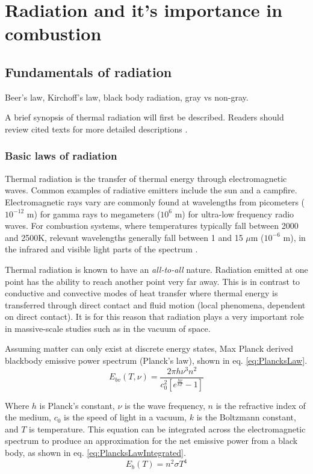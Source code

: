 \addchapheadtotoc
\chapter{Radiation and it's importance in combustion}\label{chapter:Importance}

\section{Fundamentals of radiation} \label{Sec:FundOfRad}
Beer's law, Kirchoff's law, black body radiation, gray vs non-gray.


A brief synopsis of thermal radiation will first be described. Readers should review cited texts for more detailed descriptions \cite{Howell2010ThermalTransfer,Modest2013RadiativeTransfer}.

\subsection{Basic laws of radiation}
Thermal radiation is the transfer of thermal energy through electromagnetic waves. Common examples of radiative emitters include the sun and a campfire. Electromagnetic rays vary are commonly found at wavelengths from picometers ($10^{-12}$ m) for gamma rays to megameters ($10^6$ m) for ultra-low frequency radio waves. For combustion systems, where temperatures typically fall between 2000 and 2500K, relevant wavelengths generally fall between 1 and 15 $\mu{}$m ($10^{-6}$ m), in the infrared and visible light parts of the spectrum \cite{Liu2020TheFlames}.

Thermal radiation is known to have an \textit{all-to-all} nature. Radiation emitted at one point has the ability to reach another point very far away. 
This is in contrast to conductive and convective modes of heat transfer where thermal energy is transferred through direct contact and fluid motion (local phenomena, dependent on direct contact). 
It is for this reason that radiation plays a very important role in massive-scale studies such as in the vacuum of space.

Assuming matter can only exist at discrete energy states, Max Planck derived blackbody emissive power spectrum (Planck's law), shown in eq. \ref{eq:PlancksLaw}.
\begin{equation}
    E_{bv}(T,\nu{}) = \frac{2\pi{}h\nu{}^3n^2}{c_0^2\left[e^\frac{h\nu{}}{kT}-1\right]}
    \label{eq:PlancksLaw}
\end{equation}

Where $h$ is Planck's constant, $\nu{}$ is the wave frequency, $n$ is the refractive index of the medium, $c_0$ is the speed of light in a vacuum, $k$ is the Boltzmann constant, and $T$ is temperature. This equation can be integrated across the electromagnetic spectrum to produce an approximation for the net emissive power from a black body, as shown in eq. \ref{eq:PlancksLawIntegrated}.
\begin{equation}
    E_b(T) = n^2\sigma{}T^4
    \label{eq:PlancksLawIntegrated}
\end{equation}


